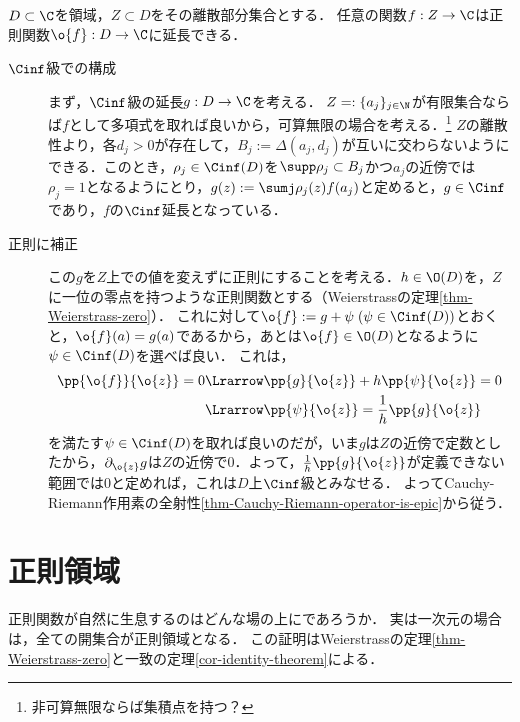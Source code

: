 \documentclass[uplatex, dvipdfmx]{jsreport}
\begin{document}
\begin{theorem}[補間定理]\label{thm-interpolation}
    $D\subset\C$を領域，$Z\subset D$をその離散部分集合とする．
    任意の関数$f:Z\to\C$は正則関数$\o{f}:D\to\C$に延長できる．
\end{theorem}
\begin{Proof}\mbox{}
    \begin{description}
        \item[$\Cinf$級での構成] まず，$\Cinf$級の延長$g:D\to\C$を考える．
        $Z=:\{a_j\}_{j\in\N}$が有限集合ならば$f$として多項式を取れば良いから，可算無限の場合を考える．\footnote{非可算無限ならば集積点を持つ？}
        $Z$の離散性より，各$d_j>0$が存在して，$B_j:=\Delta(a_j,d_j)$が互いに交わらないようにできる．このとき，$\rho_j\in\Cinf(D)$を$\supp\rho_j\subset B_j$かつ$a_j$の近傍では$\rho_j=1$となるようにとり，$g(z):=\sumj\rho_j(z)f(a_j)$と定めると，$g\in\Cinf$であり，$f$の$\Cinf$延長となっている．
        \item[正則に補正]
        この$g$を$Z$上での値を変えずに正則にすることを考える．$h\in\O(D)$を，$Z$に一位の零点を持つような正則関数とする（Weierstrassの定理\ref{thm-Weierstrass-zero}）．
        これに対して$\o{f}:=g+\psi\;(\psi\in\Cinf(D))$とおくと，$\o{f}(a)=g(a)$であるから，あとは$\o{f}\in\O(D)$となるように$\psi\in\Cinf(D)$を選べば良い．
        これは，
        \begin{align*}
            \pp{\o{f}}{\o{z}}=0&\Lrarrow\pp{g}{\o{z}}+h\pp{\psi}{\o{z}}=0\\
            &\Lrarrow\pp{\psi}{\o{z}}=\frac{1}{h}\pp{g}{\o{z}}
        \end{align*}
        を満たす$\psi\in\Cinf(D)$を取れば良いのだが，いま$g$は$Z$の近傍で定数としたから，$\partial_{\o{z}}g$は$Z$の近傍で$0$．よって，$\frac{1}{h}\pp{g}{\o{z}}$が定義できない範囲では$0$と定めれば，これは$D$上$\Cinf$級とみなせる．
        よってCauchy-Riemann作用素の全射性\ref{thm-Cauchy-Riemann-operator-is-epic}から従う．
    \end{description}
\end{Proof}

\section{正則領域}

\begin{tcolorbox}[colframe=ForestGreen, colback=ForestGreen!10!white,breakable,colbacktitle=ForestGreen!40!white,coltitle=black,fonttitle=\bfseries\sffamily,
title=]
    正則関数が自然に生息するのはどんな場の上にであろうか．
    実は一次元の場合は，全ての開集合が正則領域となる．
    この証明はWeierstrassの定理\ref{thm-Weierstrass-zero}と一致の定理\ref{cor-identity-theorem}による．
\end{tcolorbox}
\end{document}
